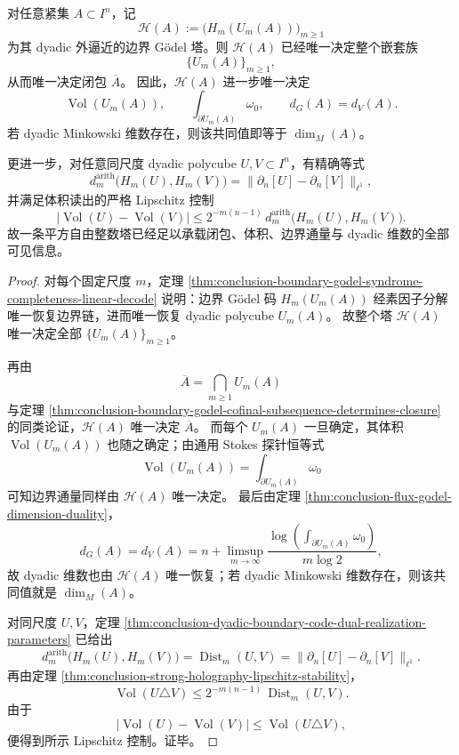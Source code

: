 \begin{theorem}\label{thm:conclusion-boundary-godel-tower-complete-arithmetic-representation}
对任意紧集 \(A\subset I^n\)，记
\[
\mathcal H(A):=\bigl(H_m(U_m(A))\bigr)_{m\ge 1}
\]
为其 dyadic 外逼近的边界 Gödel 塔。则 \(\mathcal H(A)\) 已经唯一决定整个嵌套族
\[
\{U_m(A)\}_{m\ge 1},
\]
从而唯一决定闭包 \(\overline A\)。
因此，\(\mathcal H(A)\) 进一步唯一决定
\[
\operatorname{Vol}(U_m(A)),
\qquad
\int_{\partial U_m(A)}\omega_0,
\qquad
d_G(A)=d_V(A).
\]
若 dyadic Minkowski 维数存在，则该共同值即等于 \(\dim_M(A)\)。

更进一步，对任意同尺度 dyadic polycube \(U,V\subset I^n\)，有精确等式
\[
d_m^{\mathrm{arith}}\bigl(H_m(U),H_m(V)\bigr)
=
\|\partial_n[U]-\partial_n[V]\|_{\ell^1},
\]
并满足体积读出的严格 Lipschitz 控制
\[
\bigl|\operatorname{Vol}(U)-\operatorname{Vol}(V)\bigr|
\le
2^{-m(n-1)}\,d_m^{\mathrm{arith}}\bigl(H_m(U),H_m(V)\bigr).
\]
故一条平方自由整数塔已经足以承载闭包、体积、边界通量与 dyadic 维数的全部可见信息。
\end{theorem}
\begin{proof}
对每个固定尺度 \(m\)，定理 \ref{thm:conclusion-boundary-godel-syndrome-completeness-linear-decode} 说明：边界 Gödel 码 \(H_m(U_m(A))\) 经素因子分解唯一恢复边界链，进而唯一恢复 dyadic polycube \(U_m(A)\)。
故整个塔 \(\mathcal H(A)\) 唯一决定全部 \(\{U_m(A)\}_{m\ge1}\)。

再由
\[
\overline A=\bigcap_{m\ge1}U_m(A)
\]
与定理 \ref{thm:conclusion-boundary-godel-cofinal-subsequence-determines-closure} 的同类论证，\(\mathcal H(A)\) 唯一决定 \(\overline A\)。
而每个 \(U_m(A)\) 一旦确定，其体积 \(\operatorname{Vol}(U_m(A))\) 也随之确定；由通用 Stokes 探针恒等式
\[
\operatorname{Vol}(U_m(A))=\int_{\partial U_m(A)}\omega_0
\]
可知边界通量同样由 \(\mathcal H(A)\) 唯一决定。
最后由定理 \ref{thm:conclusion-flux-godel-dimension-duality}，
\[
d_G(A)=d_V(A)
=
n+\limsup_{m\to\infty}\frac{\log\!\left(\int_{\partial U_m(A)}\omega_0\right)}{m\log 2},
\]
故 dyadic 维数也由 \(\mathcal H(A)\) 唯一恢复；若 dyadic Minkowski 维数存在，则该共同值就是 \(\dim_M(A)\)。

对同尺度 \(U,V\)，定理 \ref{thm:conclusion-dyadic-boundary-code-dual-realization-parameters} 已给出
\[
d_m^{\mathrm{arith}}\bigl(H_m(U),H_m(V)\bigr)
=
\operatorname{Dist}_m(U,V)
=
\|\partial_n[U]-\partial_n[V]\|_{\ell^1}.
\]
再由定理 \ref{thm:conclusion-strong-holography-lipschitz-stability}，
\[
\operatorname{Vol}(U\triangle V)\le 2^{-m(n-1)}\,\operatorname{Dist}_m(U,V).
\]
由于
\[
\bigl|\operatorname{Vol}(U)-\operatorname{Vol}(V)\bigr|
\le
\operatorname{Vol}(U\triangle V),
\]
便得到所示 Lipschitz 控制。证毕。
\end{proof}

